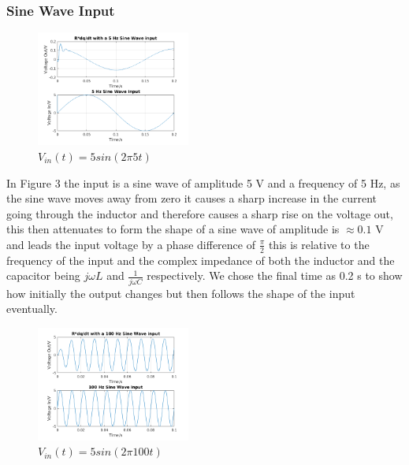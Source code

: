 \documentclass[11pt,a4paper]{article}
\begin{document}
\subsubsection{Sine Wave Input}

\begin{figure}
    \vspace{-5mm}

  		\includegraphics[width=0.45\textwidth]{Ex3_Figs/5Sine2.png}
	\vspace{-6mm}
  	\caption{$V_{in}(t)= 5sin(2 \pi 5t)$}
  	\label{fig:ex3g2}

\end{figure}

\vspace{0mm}In Figure 3 the input is a sine wave of amplitude 5 V and a frequency of 5 Hz, as the sine wave moves away from zero it causes a sharp increase in the current going through the inductor and therefore causes a sharp rise on the voltage out, this then attenuates to form the shape of a sine wave of amplitude is $\approx 0.1$ V and leads the input voltage by a phase difference of $\frac{\pi}{2}$ this is relative to the frequency of the input and the complex impedance of both the inductor and the capacitor being $j\omega L$ and $\frac{1}{j\omega C}$ respectively. We chose the final time as 0.2 s to show how initially the output changes but then follows the shape of the input eventually.

\begin{figure}
    \vspace{-15mm}
  		\includegraphics[width=0.45\textwidth]{Ex3_Figs/100Sine.png}
	\vspace{-6mm}
  	\caption{$V_{in}(t)= 5sin(2 \pi 100t)$}
  	\label{fig:ex3g3}
\end{figure}
\end{document}
